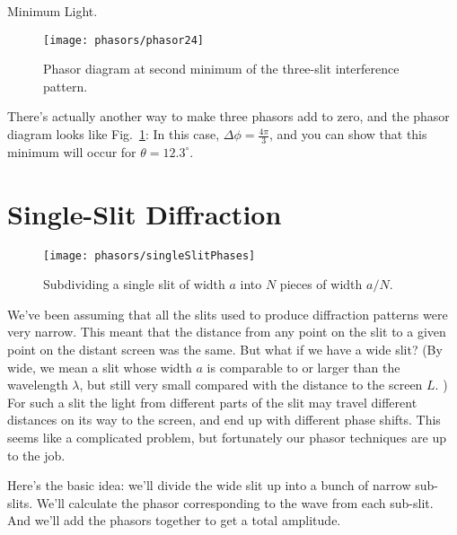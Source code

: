 \begin{exampleb}{Minimum Light.}
\begin{figure}
\begin{center}
 \texttt{[image: phasors/phasor24]}
\caption{\label{fig:phasor24}Phasor diagram at second minimum of the
 three-slit interference pattern.
}
\end{center}
\end{figure}

There's actually another way to make three phasors add to zero, and
the phasor diagram looks like Fig.~\ref{fig:phasor24}:
In this case, $\Delta\phi = \frac{4\pi}{3}$, and you can show that
this minimum will occur for $\theta = 12.3^\circ$.
\end{exampleb}

\newpage
\section{Single-Slit Diffraction}

\begin{figure}[t]
\begin{center}
\texttt{[image: phasors/singleSlitPhases]}
\end{center}
\caption{\label{singleSlitPhases}Subdividing a single
slit of width $a$ into $N$ pieces of width $a/N$.}
\end{figure}


We've been assuming that all the slits used to produce diffraction
patterns were very narrow. This meant that the distance from any point
on the slit to a given point on the distant screen was the same. But
what if we have a wide slit?  (By wide, we mean a slit whose width $a$
is comparable to or larger than the wavelength $\lambda$, but still very
small compared with the distance to the screen $L$. ) For such a slit the
light from different parts of the slit may travel different distances
on its way to the screen, and end up with different phase shifts.
This seems like a complicated problem, but fortunately our phasor
techniques are up to the job.

Here's the basic idea: we'll divide the wide slit up into a bunch of
narrow sub-slits.  We'll calculate the phasor corresponding to the
wave from each sub-slit. And we'll add the phasors together to get a
total amplitude.

